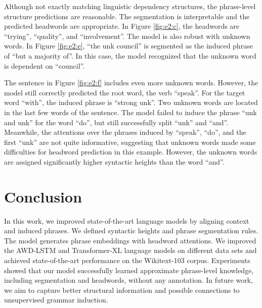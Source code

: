 \documentclass[11pt,a4paper]{article}
\begin{document}
Although not exactly matching linguistic dependency structures, the phrase-level structure predictions are reasonable. The segmentation is interpretable and the predicted headwords are appropriate. In Figure \ref{fig:e2:c}, the headwords are ``trying'', ``quality'', and ``involvement''. The model is also robust with unknown words. In Figure \ref{fig:e2:e}, ``the unk council'' is segmented as the induced phrase of ``but a majority of''. In this case, the model recognized that the unknown word is dependent on ``council''.

The sentence in Figure \ref{fig:e2:f} includes even more unknown words. However, the model still correctly predicted the root word, the verb ``speak''. For the target word ``with'', the induced phrase is ``strong unk''. Two unknown words are located in the last few words of the sentence. The model failed to induce the phrase ``unk and unk'' for the word ``do'', but still successfully split ``unk'' and ``and''. Meanwhile, the attentions over the phrases induced by ``speak'', ``do'', and the first ``unk'' are not quite informative, suggesting that unknown words made some difficulties for headword prediction in this example. However, the unknown words are assigned significantly higher syntactic heights than the word ``and''.

\section{Conclusion}

In this work, we improved state-of-the-art language models by aligning context and induced phrases. We defined syntactic heights and phrase segmentation rules. The model generates phrase embeddings with headword attentions. We improved the AWD-LSTM and Transformer-XL language models on different data sets and achieved state-of-the-art performance on the Wikitext-103 corpus. Experiments showed that our model successfully learned approximate phrase-level knowledge, including segmentation and headwords, without any annotation. In future work, we aim to capture better structural information and possible connections to unsupervised grammar induction. 





\end{document}
